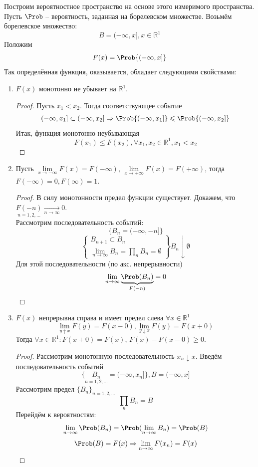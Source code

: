 Построим вероятностное пространство на основе этого измеримого пространства. Пусть $\Prob$ -- вероятность, заданная на борелевском множестве. Возьмём борелевское множество:
\[
	B = (- \infty, x], x \in \mathbb{R}^1
\]
Положим
\begin{equation}\label{2-3-1}
	F (x) = \Prob \{ (- \infty, x] \}
\end{equation}
Так определённая функция, оказывается, обладает следующими свойствами:
\begin{enumerate}
	\item $F(x)$ монотонно не убывает на $\mathbb{R}^1$.
	      \begin{proof}
		      Пусть $x_1 < x_2$. Тогда соответствующее событие
		      \[
			      (-\infty, x_1] \subset (-\infty, x_2] \Rightarrow \Prob \{ (-\infty, x_1] \} \leqslant \Prob \{ (-\infty, x_2] \}
		      \]
		      Итак, функция монотонно неубывающая
		      \[
			      F(x_1) \leqslant F(x_2), \forall x_1, x_2 \in \mathbb{R}^1, x_1 < x_2
		      \]
	      \end{proof}
	\item Пусть $\lim\limits_{x \to -\infty} F(x) = F(-\infty)$, $\lim\limits_{x \to +\infty} F(x) = F(+\infty)$, тогда $F(-\infty) = 0, F(\infty) = 1$.
	      \begin{proof}
		      В силу монотонности предел функции существует. Докажем, что $\underset{n = 1, 2, \ldots}{F(-n)} \underset{n \to \infty}{\rightarrow} 0.$ \\
		      Рассмотрим последовательность событий:
		      \[
			      \{ B_n = (-\infty, -n] \}
		      \]
		      \[
			      \left.
			      \begin{cases}
				      B_{n+1} \subset B_n \\
				      \lim\limits_{n \to \infty} B_n = \prod\limits_n B_n = \emptyset
			      \end{cases}
			      \right\}
			      B_n \downarrow \emptyset
		      \]
		      Для этой последовательности (по акс. непрерывности)
		      \[
			      \lim\limits_{n \to \infty} \underbrace{\Prob(B_n)}_{F(-n)} = 0
		      \]
	      \end{proof}
	\item $F(x)$ непрерывна справа и имеет предел слева $\forall x \in \mathbb{R}^1$
	      \[
		      \lim\limits_{y \uparrow x} F(y) = F(x - 0), \lim\limits_{y \downarrow x} F(y) = F(x + 0)
	      \]
	      Тогда $\forall x \in \mathbb{R}^1: F(x+0) = F(x)$, $F(x) - F(x-0) \geqslant 0$.
	      \begin{proof}
		      Рассмотрим монотонную последовательность $x_n \downarrow x$. Введём последовательность событий
		      \[
			      \{ \underset{n = 1, 2, \ldots}{B_n} = (-\infty, x_n] \}, B = (-\infty, x]
		      \]
		      Рассмотрим предел $\{ B_n \}_{n = 1, 2, \ldots}$
		      \[
			      \prod\limits_n B_n = B
		      \]
		      Перейдём к вероятностям:
		      \[
			      \lim\limits_{n \to \infty} \Prob(B_n) = \Prob(\lim\limits_{n \to \infty} B_n) = \Prob(B)
		      \]
		      \[
			      \Prob(B) = F(x) \Rightarrow \lim\limits_{n \to \infty} F(x_n) = F(x)
		      \]
	      \end{proof}
\end{enumerate}

